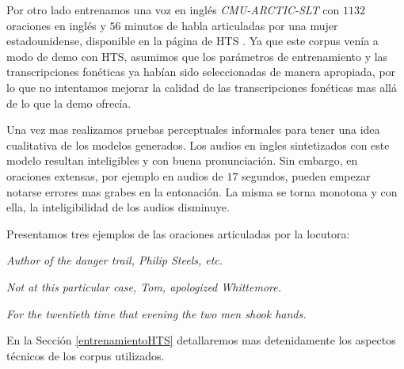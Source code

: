 Por otro lado entrenamos una voz en inglés \textit{CMU-ARCTIC-SLT} \cite{cmuArtic} con $1132$ oraciones en inglés y $56$ minutos de habla articuladas por una mujer estadounidense, disponible en la página de HTS \cite{hts}. Ya que este corpus venía a modo de demo con HTS, asumimos que los parámetros de entrenamiento y las transcripciones fonéticas ya habían sido seleccionadas de manera apropiada, por lo que no intentamos mejorar la calidad de las transcripciones fonéticas mas allá de lo que la demo ofrecía. 

Una vez mas realizamos pruebas perceptuales informales para tener una idea cualitativa de los modelos generados. Los audios en ingles sintetizados con este modelo resultan inteligibles y con buena pronunciación. Sin embargo, en oraciones extensas, por ejemplo en audios de $17$ segundos, pueden empezar notarse errores mas grabes en la entonación. La misma se torna monotona y con ella, la inteligibilidad de los audios disminuye. 

Presentamos tres ejemplos de las oraciones articuladas por la locutora:

\indent\indent \textit{Author of the danger trail, Philip Steels, etc.}

\indent\indent \textit{Not at this particular case, Tom, apologized Whittemore.}

\indent\indent \textit{For the twentieth time that evening the two men shook hands.}

En la Sección \ref{entrenamientoHTS} detallaremos mas detenidamente los aspectos técnicos de los corpus utilizados.

